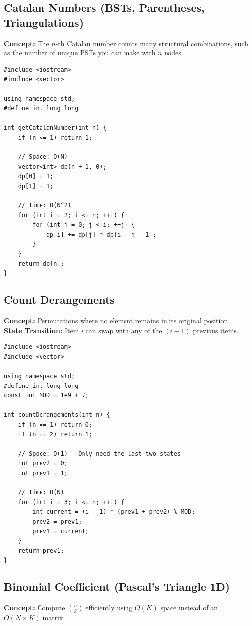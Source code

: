 \subsection{Catalan Numbers (BSTs, Parentheses, Triangulations)}
\textbf{Concept:} The $n$-th Catalan number counts many structural combinations, such as the number of unique BSTs you can make with $n$ nodes.

\begin{lstlisting}
#include <iostream>
#include <vector>

using namespace std;
#define int long long

int getCatalanNumber(int n) {
    if (n <= 1) return 1;
    
    // Space: O(N)
    vector<int> dp(n + 1, 0);
    dp[0] = 1;
    dp[1] = 1;
    
    // Time: O(N^2)
    for (int i = 2; i <= n; ++i) {
        for (int j = 0; j < i; ++j) {
            dp[i] += dp[j] * dp[i - j - 1];
        }
    }
    return dp[n];
}
\end{lstlisting}

\subsection{Count Derangements}
\textbf{Concept:} Permutations where no element remains in its original position. \\
\textbf{State Transition:} Item $i$ can swap with any of the $(i-1)$ previous items. 

\begin{lstlisting}
#include <iostream>
#include <vector>

using namespace std;
#define int long long
const int MOD = 1e9 + 7;

int countDerangements(int n) {
    if (n == 1) return 0;
    if (n == 2) return 1;
    
    // Space: O(1) - Only need the last two states
    int prev2 = 0;
    int prev1 = 1;
    
    // Time: O(N)
    for (int i = 3; i <= n; ++i) {
        int current = (i - 1) * (prev1 + prev2) % MOD;
        prev2 = prev1;
        prev1 = current;
    }
    return prev1;
}
\end{lstlisting}

\subsection{Binomial Coefficient (Pascal's Triangle 1D)}
\textbf{Concept:} Compute $\binom{n}{k}$ efficiently using $O(K)$ space instead of an $O(N \times K)$ matrix.

